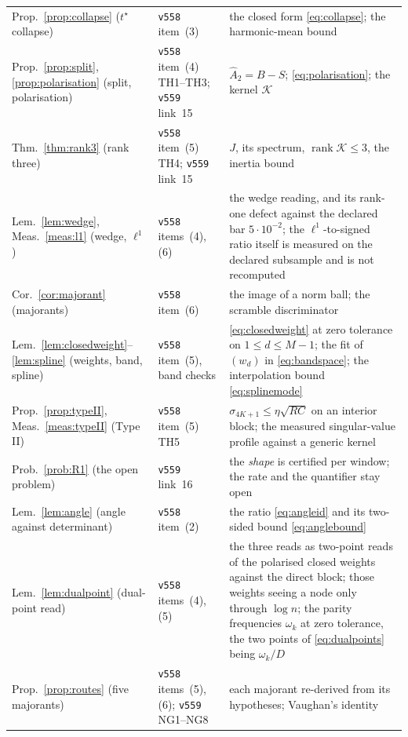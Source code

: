 \documentclass[11pt,a4paper]{article}
\theoremstyle{plain}
\theoremstyle{definition}
\newcommand{\Ah}{\widehat{A}}
\DeclareMathOperator{\rank}{rank}
\begin{document}
{\begin{xltabular}{\textwidth}{@{}llY@{}}
Prop.~\ref{prop:collapse} ($t^{\star}$ collapse)
  & \texttt{v558} item~(3)
  & the closed form \eqref{eq:collapse}; the harmonic-mean bound \\
Prop.~\ref{prop:split}, \ref{prop:polarisation} (split, polarisation)
  & \texttt{v558} item~(4) TH1--TH3; \texttt{v559} link~15
  & $\Ah_2=B-S$; \eqref{eq:polarisation}; the kernel $\mathcal K$ \\
Thm.~\ref{thm:rank3} (rank three)
  & \texttt{v558} item~(5) TH4; \texttt{v559} link~15
  & $J$, its spectrum, $\rank\mathcal K\le3$, the inertia bound \\
Lem.~\ref{lem:wedge}, Meas.~\ref{meas:l1} (wedge, $\ell^{1}$)
  & \texttt{v558} items~(4), (6)
  & the wedge reading, and its rank-one defect against the declared bar
    $5\cdot10^{-2}$; the $\ell^{1}$-to-signed ratio itself is measured on the
    declared subsample and is not recomputed \\
Cor.~\ref{cor:majorant} (majorants)
  & \texttt{v558} item~(6)
  & the image of a norm ball; the scramble discriminator \\
Lem.~\ref{lem:closedweight}--\ref{lem:spline} (weights, band, spline)
  & \texttt{v558} item~(5), band checks
  & \eqref{eq:closedweight} at zero tolerance on $1\le d\le M-1$; the fit of
    $(w_d)$ in \eqref{eq:bandspace}; the interpolation bound
    \eqref{eq:splinemode} \\
Prop.~\ref{prop:typeII}, Meas.~\ref{meas:typeII} (Type II)
  & \texttt{v558} item~(5) TH5
  & $\sigma_{4K+1}\le\eta\sqrt{RC}$ on an interior block; the measured
    singular-value profile against a generic kernel \\
Prob.~\ref{prob:R1} (the open problem)
  & \texttt{v559} link~16
  & the \emph{shape} is certified per window; the rate and the
    quantifier stay open \\
Lem.~\ref{lem:angle} (angle against determinant)
  & \texttt{v558} item~(2)
  & the ratio \eqref{eq:angleid} and its two-sided bound
    \eqref{eq:anglebound} \\
Lem.~\ref{lem:dualpoint} (dual-point read)
  & \texttt{v558} items~(4), (5)
  & the three reads as two-point reads of the polarised closed weights against
    the direct block; those weights seeing a node only through $\log n$; the
    parity frequencies $\omega_k$ at zero tolerance, the two points of
    \eqref{eq:dualpoints} being $\omega_k/D$ \\
Prop.~\ref{prop:routes} (five majorants)
  & \texttt{v558} items~(5), (6); \texttt{v559} NG1--NG8
  & each majorant re-derived from its hypotheses; Vaughan's identity

\end{xltabular}}
\end{document}
